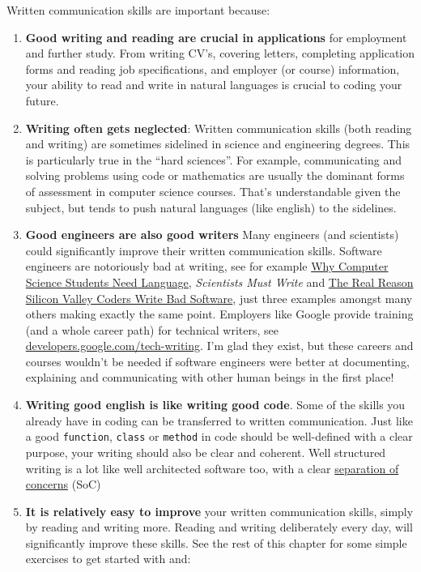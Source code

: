 \documentclass[
]{book}
\providecommand{\tightlist}{%
  \setlength{\itemsep}{0pt}\setlength{\parskip}{0pt}}
\begin{document}
Written communication skills are important because:

\begin{enumerate}
\def\labelenumi{\arabic{enumi}.}
\tightlist
\item
  \textbf{Good writing and reading are crucial in applications} for employment and further study. From writing CV's, covering letters, completing application forms and reading job specifications, and employer (or course) information, your ability to read and write in natural languages is crucial to coding your future.
\item
  \textbf{Writing often gets neglected}: Written communication skills (both reading and writing) are sometimes sidelined in science and engineering degrees. This is particularly true in the ``hard sciences''. For example, communicating and solving problems using code or mathematics are usually the dominant forms of assessment in computer science courses. That's understandable given the subject, but tends to push natural languages (like english) to the sidelines.
\item
  \textbf{Good engineers are also good writers} Many engineers (and scientists) could significantly improve their written communication skills. Software engineers are notoriously bad at writing, see for example \href{https://dl.acm.org/doi/10.1145/960492.960525}{Why Computer Science Students Need Language}, \citep{Beaubouef2003} \emph{Scientists Must Write} \citep{scientistsmustwrite} and \href{https://www.theatlantic.com/national/archive/2012/10/the-real-reason-silicon-valley-coders-write-bad-software/263377/}{The Real Reason Silicon Valley Coders Write Bad Software}, \citep{writebadsoftware} just three examples amongst many others making exactly the same point. Employers like Google provide training (and a whole career path) for technical writers, see \href{https://developers.google.com/tech-writing}{developers.google.com/tech-writing}. I'm glad they exist, but these careers and courses wouldn't be needed if software engineers were better at documenting, explaining and communicating with other human beings in the first place!
\item
  \textbf{Writing good english is like writing good code}. Some of the skills you already have in coding can be transferred to written communication. Just like a good \texttt{function}, \texttt{class} or \texttt{method} in code should be well-defined with a clear purpose, your writing should also be clear and coherent. Well structured writing is a lot like well architected software too, with a clear \href{https://en.wikipedia.org/wiki/Separation_of_concerns}{separation of concerns} (SoC)
\item
  \textbf{It is relatively easy to improve} your written communication skills, simply by reading and writing more. Reading and writing deliberately every day, will significantly improve these skills. See the rest of this chapter for some simple exercises to get started with and:


\end{enumerate}
\end{document}
